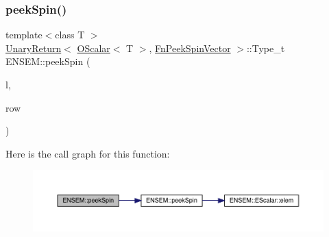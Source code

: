 \mbox{\label{group__obsscalar_gad99eae88a001d667225b11a6f8b73d7e}} 
\subsubsection{\texorpdfstring{peekSpin()}{peekSpin()}\hspace{0.1cm}{\footnotesize\ttfamily [1/2]}}
{\footnotesize\ttfamily template$<$class T $>$ \\
\mbox{\hyperlink{structENSEM_1_1UnaryReturn}{Unary\+Return}}$<$ \mbox{\hyperlink{classENSEM_1_1OScalar}{O\+Scalar}}$<$ T $>$, \mbox{\hyperlink{structENSEM_1_1FnPeekSpinVector}{Fn\+Peek\+Spin\+Vector}} $>$\+::Type\+\_\+t E\+N\+S\+E\+M\+::peek\+Spin (\begin{DoxyParamCaption}\item[{const \mbox{\hyperlink{classENSEM_1_1OScalar}{O\+Scalar}}$<$ T $>$ \&}]{l,  }\item[{int}]{row }\end{DoxyParamCaption})\hspace{0.3cm}{\ttfamily [inline]}}

Here is the call graph for this function\+:\nopagebreak
\begin{figure}[H]
\begin{center}
\leavevmode
\includegraphics[width=350pt]{d1/d71/group__obsscalar_gad99eae88a001d667225b11a6f8b73d7e_cgraph}
\end{center}
\end{figure}
\mbox{\label{group__obsscalar_ga9ce0c024aa13d3c00740b9a82d2912db}} 
